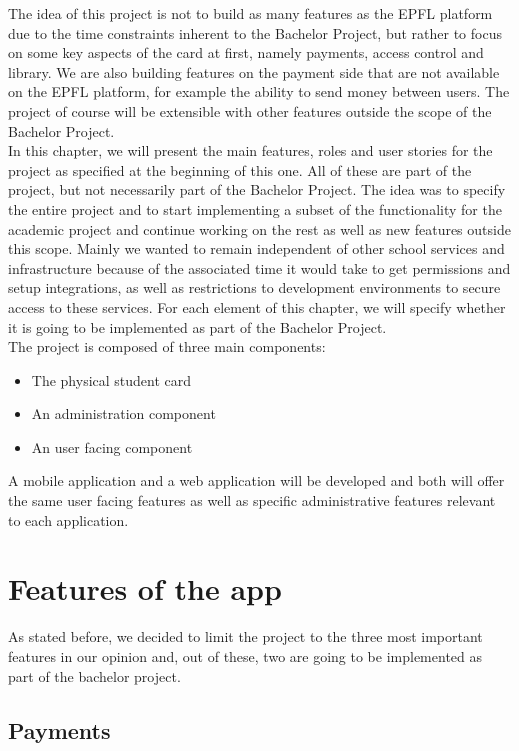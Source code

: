 \documentclass[11pt,a4paper]{report}
\begin{document}
The idea of this project is not to build as many features as the EPFL platform due to the time constraints inherent to the Bachelor Project, but rather to focus on some key aspects of the card at first, namely payments, access control and library. We are also building features on the payment side that are not available on the EPFL platform, for example the ability to send money between users. The project of course will be extensible with other features outside the scope of the Bachelor Project. \\

In this chapter, we will present the main features, roles and user stories for the project as specified at the beginning of this one. All of these are part of the project, but not necessarily part of the Bachelor Project. The idea was to specify the entire project and to start implementing a subset of the functionality for the academic project and continue working on the rest as well as new features outside this scope. Mainly we wanted to remain independent of other school services and infrastructure because of the associated time it would take to get permissions and setup integrations, as well as restrictions to development environments to secure access to these services. For each element of this chapter, we will specify whether it is going to be implemented as part of the Bachelor Project.\\

The project is composed of three main components:
\begin{itemize}
    \item The physical student card
    \item An administration component
    \item An user facing component
\end{itemize}

A mobile application and a web application will be developed and both will offer the same user facing features as well as specific administrative features relevant to each application.

\section{Features of the app}
As stated before, we decided to limit the project to the three most important features in our opinion and, out of these, two are going to be implemented as part of the bachelor project.

\subsection{Payments}
\end{document}
